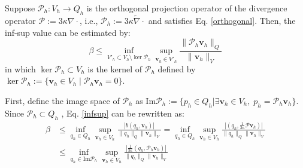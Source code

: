 \begin{lma}\label{lma}
Suppose $\mathcal{P}_h: V_h \rightarrow Q_h$ is the orthogonal projection operator of the divergence operator $\mathcal{P} := 3\kappa \nabla \cdot$, i.e., $\mathcal{P}_h := 3\kappa \tilde{\nabla} \cdot$ and satisfies Eq. \eqref{orthogonal}. Then, the inf-sup value can be estimated by:
\begin{equation}\label{r1}
\beta \le \inf_{V'_h \subset V_h \setminus \ker \mathcal{P}_h} \sup_{\boldsymbol{v}_h \in V'_h} \frac{\|\mathcal{P}_h \boldsymbol{v}_h\|_Q}{\|\boldsymbol{v}_h\|_V}
\end{equation}
in which $\ker \mathcal{P}_h \subset V_h$ is the kernel of $\mathcal{P}_h$ defined by $\ker \mathcal{P}_h := \{\boldsymbol{v}_h \in V_h \mid \mathcal{P}_h \boldsymbol{v}_h = 0\}$.
\end{lma}
\begin{pf}
First, define the image space of $\mathcal{P}_h$ as $\mathrm{Im}\mathcal{P}_h := \{p_h \in Q_h \vert \exists \boldsymbol{v}_h \in V_h, \; p_h = \mathcal{P}_h \boldsymbol{v}_h\}$.
Since $\mathcal{P}_h\subset Q_h$
, Eq. \eqref{infsup} can be rewritten as:
\begin{equation} \label{r11}
\begin{split}
\beta &\le \inf_{q_h \in Q_h} \sup_{\boldsymbol{v}_h \in V_h} \frac{|b(q_h, \boldsymbol{v}_h)|}{\|q_h\|_Q \|\boldsymbol{v}_h\|_V}
= \inf_{q_h \in Q_h} \sup_{\boldsymbol{v}_h \in V_h} \frac{|(q_h, \frac{1}{3\kappa} \mathcal{P} \boldsymbol{v}_h)|}{\|q_h\|_Q \|\boldsymbol{v}_h\|_V} \\
&\le \inf_{q_h \in \mathrm{Im} \mathcal{P}_h} \sup_{\boldsymbol{v}_h \in V_h} \frac{|\frac{1}{3\kappa} (q_h, \mathcal{P}_h \boldsymbol{v}_h)|}{\|q_h\|_Q \|\boldsymbol{v}_h\|_V}
\end{split}
\end{equation}


\end{pf}
